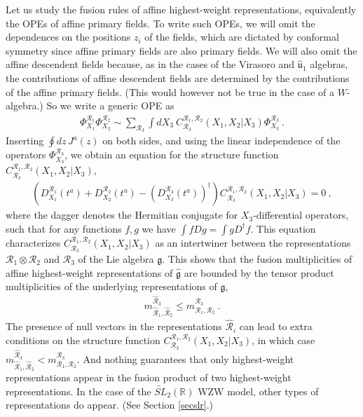 \documentclass[12pt, a4paper, notitlepage, twoside]{report}
\numberwithin{equation}{section}
\theoremstyle{break}
\begin{document}
Let us study the fusion rules of affine highest-weight representations, equivalently the OPEs of affine primary fields.
To write such OPEs, we will omit the dependences on the positions $z_i$ of the fields, which are dictated by conformal symmetry since affine primary fields are also primary fields.
We will also omit the affine descendent fields because, as in the cases of the Virasoro and $\hat{\mathfrak{u}}_1$ algebras, the contributions of affine descendent fields are determined by the contributions of the affine primary fields. (This would however not be true in the case of a $W$-algebra.) So we write a generic OPE as 
\begin{align}
 \Phi^{\mathcal{R}_1}_{X_1}\Phi^{\mathcal{R}_2}_{X_2} \sim \sum_{\mathcal{R}_3} \int dX_3\ C^{\mathcal{R}_1,\mathcal{R}_2}_{\mathcal{R}_3}(X_1,X_2|X_3) \Phi^{\mathcal{R}_3}_{X_3}\ .
\end{align}
Inserting $\oint dz\, J^a(z)$ on both sides, and using the linear independence of the operators $\Phi^{\mathcal{R}_3}_{X_3}$, we obtain an equation for the structure function $C^{\mathcal{R}_1,\mathcal{R}_2}_{\mathcal{R}_3}(X_1,X_2|X_3)$,
\begin{align}
 \left(D_{X_1}^{\mathcal{R}_1}(t^a)+D_{X_2}^{\mathcal{R}_2}(t^a)-\left(D_{X_3}^{\mathcal{R}_3}(t^a)\right)^\dagger\right) C^{\mathcal{R}_1,\mathcal{R}_2}_{\mathcal{R}_3}(X_1,X_2|X_3) = 0\ ,
\label{dddc}
\end{align}
where the dagger denotes the Hermitian conjugate for $X_3$-differential operators, such that for any functions $f,g$ we have 
$\int fDg =\int g D^\dagger f$.
This equation characterizes $C^{\mathcal{R}_1,\mathcal{R}_2}_{\mathcal{R}_3}(X_1,X_2|X_3)$ as an intertwiner between the representations $\mathcal{R}_1\otimes \mathcal{R}_2$ and $\mathcal{R}_3$ of the Lie algebra $\mathfrak{g}$.
This shows that the fusion multiplicities of affine highest-weight representations of $\hat{\mathfrak{g}}$ are bounded by the tensor product multiplicities of the underlying representations of $\mathfrak{g}$, 
\begin{align}
 m_{\hat{\mathcal{R}}_1,\hat{\mathcal{R}}_2}^{\hat{\mathcal{R}}_3} \leq m_{\mathcal{R}_1,\mathcal{R}_2}^{\mathcal{R}_3}\ .
\end{align}
The presence of null vectors in the representations $\hat{\mathcal{R}}_i$ can lead to extra conditions on the structure function $C^{\mathcal{R}_1,\mathcal{R}_2}_{\mathcal{R}_3}(X_1,X_2|X_3)$, in which case $m_{\hat{\mathcal{R}}_1,\hat{\mathcal{R}}_2}^{\hat{\mathcal{R}}_3} < m_{\mathcal{R}_1,\mathcal{R}_2}^{\mathcal{R}_3}$. 
And nothing guarantees that only highest-weight representations appear in the fusion product of two highest-weight representations. 
In the case of the $\widetilde{SL}_2(\mathbb{R})$ WZW model, other types of representations do appear. (See Section \ref{secslr}.) 
\end{document}
